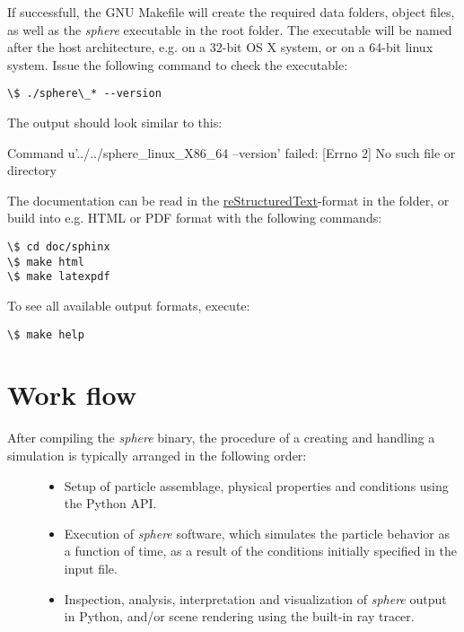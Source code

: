 \documentclass[letterpaper,10pt,english]{sphinxmanual}
\begin{document}
If successfull, the GNU Makefile will create the required data folders, object files, as well as the \emph{sphere} executable in the root folder. The executable will be named after the host architecture, e.g.  on a 32-bit OS X system, or  on a 64-bit linux system. Issue the following command to check the executable:

\begin{Verbatim}[commandchars=\\\{\}]
\$ ./sphere\_* --version
\end{Verbatim}

The output should look similar to this:

Command u'../../sphere\_linux\_X86\_64 --version' failed: {[}Errno 2{]} No such file or directory


The documentation can be read in the \href{http://docutils.sourceforge.net/docs/ref/rst/restructuredtext.html}{reStructuredText}-format in the  folder, or build into e.g. HTML or PDF format with the following commands:

\begin{Verbatim}[commandchars=\\\{\}]
\$ cd doc/sphinx
\$ make html
\$ make latexpdf
\end{Verbatim}

To see all available output formats, execute:

\begin{Verbatim}[commandchars=\\\{\}]
\$ make help
\end{Verbatim}


\section{Work flow}
\label{introduction:work-flow}\begin{description}
\item[{After compiling the \emph{sphere} binary, the procedure of a creating and handling a simulation is typically arranged in the following order:}] \leavevmode\begin{itemize}
\item {} 
Setup of particle assemblage, physical properties and conditions using the Python API.

\item {} 
Execution of \emph{sphere} software, which simulates the particle behavior as a function of time, as a result of the conditions initially specified in the input file.

\item {} 
Inspection, analysis, interpretation and visualization of \emph{sphere} output in Python, and/or scene rendering using the built-in ray tracer.

\end{itemize}

\end{description}
\end{document}
